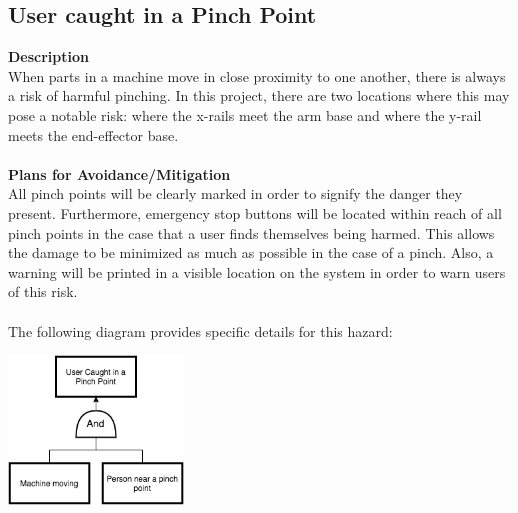 \documentclass[titlepage]{article}
\begin{document}
\subsection{User caught in a Pinch Point}
\textbf{Description}\\
When parts in a machine move in close proximity to one another, there is always a risk of harmful pinching. In this project, there are two locations where this may pose a notable risk: where the x-rails meet the arm base and where the y-rail meets the end-effector base.\\~\\
\textbf{Plans for Avoidance/Mitigation}\\
All pinch points will be clearly marked in order to signify the danger they present. Furthermore, emergency stop buttons will be located within reach of all pinch points in the case that a user finds themselves being harmed. This allows the damage to be minimized as much as possible in the case of a pinch. Also, a warning will be printed in a visible location on the system in order to warn users of this risk.\\~\\
The following diagram provides specific details for this hazard:\\
\begin{center}
	\includegraphics[width=0.35\textwidth]{PinchPointFTA.png}
\label{fig:yRailFig}
\end{center}

\newpage
\end{document}
